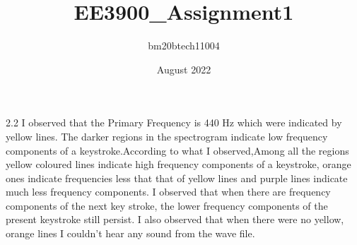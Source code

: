 \documentclass{article}
\title{EE3900_Assignment1}
\author{bm20btech11004 }
\date{August 2022}
\begin{document}
                              

\Large
 2.2        I observed that the Primary Frequency is 440 Hz which were indicated by yellow lines. The darker regions in the spectrogram indicate low frequency components of a keystroke.According to what I observed,Among all the regions yellow coloured lines indicate high frequency components of a keystroke, orange ones indicate frequencies less that that of yellow lines and purple lines indicate much less frequency components. I observed that when there are frequency components of the next key stroke, the lower frequency components of the present keystroke still persist. I also observed that when there were no yellow, orange lines I couldn't hear any sound from the wave file.
\end{document}
